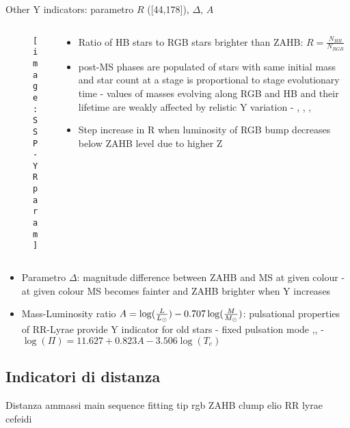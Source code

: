 \begin{frame}{Other Y indicators: parametro $R$ ([44,178]), $\Delta$, $A$}
\begin{columns}[T]
	\begin{column}{0.5\textwidth}
		\begin{figure}[!ht]
			\texttt{[image: SSP-YRparam]}\label{fig:SSP-YRparam}
		\end{figure}
	\end{column}
	\begin{column}{0.45\textwidth}
		\begin{itemize}
			\item Ratio of HB stars to RGB stars brighter than ZAHB:  $R=\frac{N_{HB}}{N_{RGB}}$
			\item post-MS phases are populated of stars with same initial mass and star count at a stage is proportional to stage evolutionary time - values of masses evolving along RGB and HB and their lifetime are weakly affected by relistic Y variation - , , , 
			\item Step increase in R when luminosity of RGB bump decreases below ZAHB level due to higher Z
		\end{itemize}
	\end{column}
\end{columns}
\begin{itemize}
\item Parametro $\Delta$: magnitude difference between ZAHB and MS at given colour - at given colour MS becomes fainter and ZAHB brighter when Y increases
\item Mass-Luminosity ratio $A=\log(\frac{L}{L_{\odot}})-0.707\log(\frac{M}{M_{\odot}})$: pulsational properties of RR-Lyrae provide Y indicator for old stars - fixed pulsation mode ,, - $\log(\Pi)=11.627+0.823A-3.506\log(T_e)$
\end{itemize}
\end{frame}

\subsection{Indicatori di distanza}

\begin{frame}{Distanza ammassi}
main sequence fitting
tip rgb
ZAHB
clump elio
RR lyrae
cefeidi
\end{frame}


